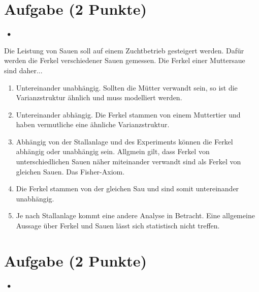 \documentclass[a4paper, 9pt]{scrartcl}\usepackage[]{graphicx}\usepackage[]{xcolor}
\begin{document}
\section{Aufgabe \hfill (2 Punkte)}

\ifcollection
\begin{flushright}
\tiny\vspace{-2Ex}
\textbf{\examinhaltstart}
\exammodulestatversuch $\;\bullet$
\exammodulebiostat
\vspace{-1Ex}
\end{flushright}
\fi




Die Leistung von Sauen soll auf einem Zuchtbetrieb gesteigert werden. Dafür werden die Ferkel verschiedener Sauen gemessen. Die Ferkel einer Muttersaue sind daher...



\begin{enumerate}
\item [\textbf{A} \msquare] Untereinander unabhängig. Sollten die Mütter verwandt sein, so ist die Varianzstruktur ähnlich und muss modelliert werden.
\item [\textbf{B} \msquare] Untereinander abhängig. Die Ferkel stammen von einem Muttertier und haben vermutliche eine ähnliche Varianzstruktur.
\item [\textbf{C} \msquare] Abhängig von der Stallanlage und des Experiments können die Ferkel abhängig oder unabhängig sein. Allgmein gilt, dass Ferkel von unterschiedlichen Sauen näher miteinander verwandt sind als Ferkel von gleichen Sauen. Das Fisher-Axiom.
\item [\textbf{D} \msquare] Die Ferkel stammen von der gleichen Sau und sind somit untereinander unabhängig.
\item [\textbf{E} \msquare] Je nach Stallanlage kommt eine andere Analyse in Betracht. Eine allgemeine Aussage über Ferkel und Sauen lässt sich statistisch nicht treffen.
\end{enumerate}

\section{Aufgabe \hfill (2 Punkte)}

\ifcollection
\begin{flushright}
\tiny\vspace{-2Ex}
\textbf{\examinhaltstart}
\exammodulestatversuch $\;\bullet$
\exammodulebiostat
\vspace{-1Ex}
\end{flushright}
\fi
\end{document}

